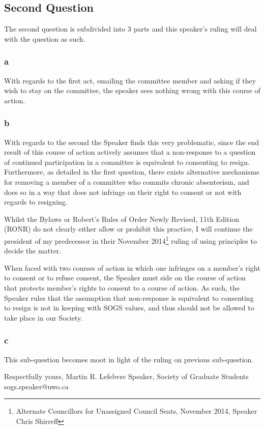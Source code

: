 \documentclass[12pt,letterpaper]{book}
\begin{document}
\subsection*{Second Question}

The second question is subdivided into 3 parts and this speaker's ruling will deal with the question as such. 
\subsubsection*{a}
With regards to the first act, emailing the committee member and asking if they wish to stay on the committee, the speaker sees nothing wrong with this course of action. 

\subsubsection*{b}
With regards to the second the Speaker finds this very problematic, since the end result of this course of action actively assumes that a non-response to a question of continued participation in a committee is equivalent to consenting to resign. Furthermore, as detailed in the first question, there exists alternative mechanisms for removing a member of a committee who commits chronic absenteeism, and does so in a way that does not infringe on their right to consent or not with regards to resigning.    

Whilst the Bylaws or Robert's Rules of Order Newly Revised, 11th Edition (RONR) do not clearly either allow or prohibit this practice, I will continue the president of my predecessor in their November 2014\footnote{Alternate Councillors for Unassigned Council Seats, November 2014, Speaker Chris Shirreff} ruling of using principles to decide the matter.  

When faced with two courses of action in which one infringes on a member's right to consent or to refuse consent, the Speaker must side on the course of action that protects member's rights to consent to a course of action.  As such, the Speaker rules that the assumption that non-response is equivalent to consenting to resign is not in keeping with SOGS values, and thus should not be allowed to take place in our Society.  
	
\subsubsection*{c}
This sub-question becomes moot in light of the ruling on previous sub-question. 

\vskip 3cm


\noindent
Respectfully yours, \newline
\noindent
Martin R. Lefebvre \newline
\indent
Speaker, \newline 
\indent
Society of Graduate Students \newline
\indent
sogs.speaker@uwo.ca \newline
\end{document}
